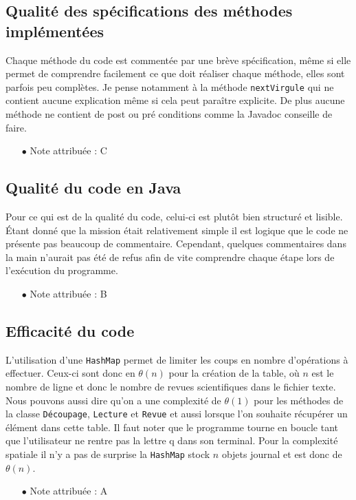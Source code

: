 \documentclass[11pt]{article}
\begin{document}
\subsection{Qualité des spécifications des méthodes implémentées}

Chaque méthode du code est commentée par une brève spécification, même si elle permet de comprendre facilement ce que doit réaliser chaque méthode, elles sont parfois peu complètes. Je pense notamment à la méthode \verb+nextVirgule+ qui ne contient aucune explication même si cela peut paraître explicite. De plus aucune méthode ne contient de post ou pré conditions comme la Javadoc conseille de faire.
\\
\begin{itemize}
\item[$\bullet$] Note attribuée : C
\end{itemize}

\subsection{Qualité du code en Java}

Pour ce qui est de la qualité du code, celui-ci est plutôt bien structuré et lisible. Étant donné que la mission était relativement simple il est logique que le code ne présente pas beaucoup de commentaire. Cependant, quelques commentaires dans la main n'aurait pas été de refus afin de vite comprendre chaque étape lors de l'exécution du programme.
\\
\begin{itemize}
\item[$\bullet$] Note attribuée : B
\end{itemize}

\subsection{Efficacité du code}

L'utilisation d'une \verb+HashMap+ permet de limiter les coups en nombre d'opérations à effectuer. Ceux-ci sont donc en $\theta(n)$
pour la création de la table, où $n$ est le nombre de ligne et donc le nombre de revues scientifiques dans le fichier texte. Nous pouvons aussi dire qu'on a une complexité de $\theta(1)$ pour les méthodes de la classe \verb+Découpage+, \verb+Lecture+ et \verb+Revue+ et aussi lorsque l'on souhaite récupérer un élément dans cette table. Il faut noter que le programme tourne en boucle tant que l'utilisateur ne rentre pas la lettre q dans son terminal. Pour la complexité spatiale il n'y a pas de surprise la \verb+HashMap+ stock $n$ objets journal et est donc de $\theta(n)$.
\\
\begin{itemize}
\item[$\bullet$] Note attribuée : A
\end{itemize}
\end{document}
